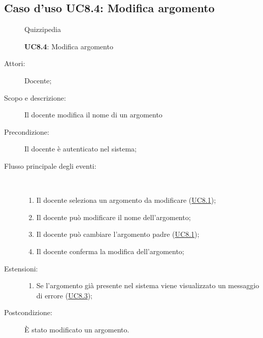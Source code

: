 \subsection{Caso d'uso UC8.4: Modifica argomento}
	\begin{figure}[H]
		\centering
		\begin{resizedtikzpicture}{\textwidth}
		\begin{umlsystem}[x=0, fill=lightgray!20]{Quizzipedia}
		\end{umlsystem}
		\end{resizedtikzpicture}
		\caption{\textbf{UC8.4}: Modifica argomento}
		\label{UC8.4}
	\end{figure}
\begin{description}
\item[Attori:] Docente;
\item[Scopo e descrizione:] Il docente modifica il nome di un argomento
      \item[Precondizione:] Il docente è autenticato nel sistema;

        \item[Flusso principale degli eventi:] \ 
 \begin{enumerate}
          \item Il docente seleziona un argomento da modificare (\hyperlink{UC8.1}{UC8.1});
          \item Il docente può modificare il nome dell'argomento;
          \item Il docente può cambiare l'argomento padre (\hyperlink{UC8.1}{UC8.1});
          \item Il docente conferma la modifica dell'argomento;

      \end{enumerate}
    \item[Estensioni:]
      \begin{enumerate}
          \item Se l'argomento già presente nel sistema viene visualizzato un messaggio di errore (\hyperlink{UC8.3}{UC8.3});

      \end{enumerate}
    \item[Postcondizione:] È stato modificato un argomento.
  \end{description}
\hypertarget{UC8.5}{}
